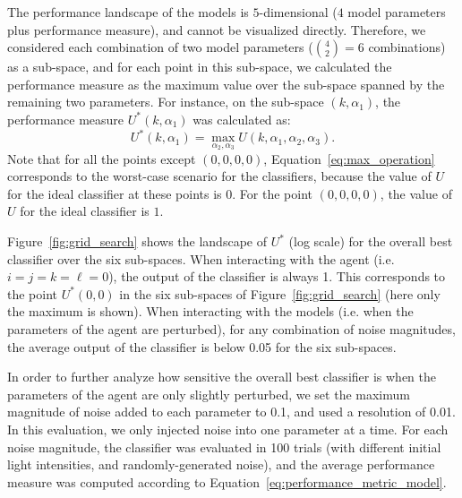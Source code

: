 The performance landscape of the models is $5$-dimensional ($4$ model parameters plus performance measure), and cannot be visualized directly. Therefore, we considered each combination of two model parameters ($\binom{4}{2}=6$ combinations) as a sub-space, and for each point in this sub-space, we calculated the performance measure as the maximum value over the sub-space spanned by the remaining two parameters. For instance, on the sub-space $\left(k, \alpha_1\right)$, the performance measure $U^{*}\left(k, \alpha_1\right)$ was calculated as:
\begin{equation}
U^{*}\left(k, \alpha_1\right) = \max_{\alpha_2,\alpha_3} 
U\left(k, \alpha_1, \alpha_2, \alpha_3\right).
\label{eq:max_operation}
\end{equation}
Note that for all the points except $(0,0,0,0)$, Equation~\ref{eq:max_operation} corresponds to the worst-case scenario for the classifiers, because the value of $U$ for the ideal classifier at these points is $0$. For the point $(0,0,0,0)$, the value of $U$ for the ideal classifier is $1$. 

Figure~\ref{fig:grid_search} shows the landscape of $U^{*}$ (log scale) for the overall best classifier over the six sub-spaces.
When interacting with the agent (i.e. $i=j=k=\ell=0$), the output of the classifier is always 1. This corresponds to the point $U^{*}(0,0)$ in the six sub-spaces of Figure~\ref{fig:grid_search} (here only the maximum is shown). When interacting with the models (i.e. when the parameters of the agent are perturbed), for any combination of noise magnitudes, the average output of the classifier is
below 0.05 for the six sub-spaces. 

In order to further analyze how sensitive the overall best classifier is when the parameters of the agent are only slightly perturbed, we set the maximum magnitude of noise added to each parameter to 0.1, and used a resolution of 0.01. In this evaluation, we only injected noise into one parameter at a time. For each noise magnitude, the classifier was evaluated in 100 trials (with different initial light intensities, and randomly-generated noise), and the average performance measure was computed according to Equation~\ref{eq:performance_metric_model}. 

